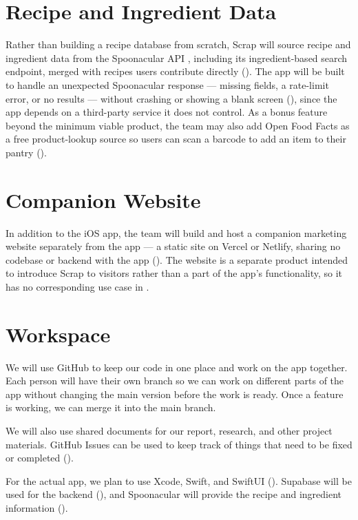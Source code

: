 \section{Recipe and Ingredient Data}
Rather than building a recipe database from scratch, Scrap will source recipe and ingredient data from the Spoonacular API \cite{SpoonacularAPI}, including its ingredient-based search endpoint, merged with recipes users contribute directly (). The app will be built to handle an unexpected Spoonacular response --- missing fields, a rate-limit error, or no results --- without crashing or showing a blank screen (), since the app depends on a third-party service it does not control. As a bonus feature beyond the minimum viable product, the team may also add Open Food Facts as a free product-lookup source so users can scan a barcode to add an item to their pantry ().

\section{Companion Website}
In addition to the iOS app, the team will build and host a companion marketing website separately from the app --- a static site on Vercel or Netlify, sharing no codebase or backend with the app (). The website is a separate product intended to introduce Scrap to visitors rather than a part of the app's functionality, so it has no corresponding use case in .

\section{Workspace}
We will use GitHub to keep our code in one place and work on the app together. Each person will have their own branch so we can work on different parts of the app without changing the main version before the work is ready. Once a feature is working, we can merge it into the main branch.

We will also use shared documents for our report, research, and other project materials. GitHub Issues can be used to keep track of things that need to be fixed or completed ().

For the actual app, we plan to use Xcode, Swift, and SwiftUI (). Supabase will be used for the backend (), and Spoonacular will provide the recipe and ingredient information ().

